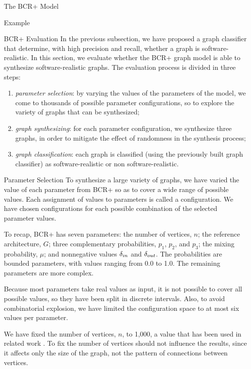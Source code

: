 \documentclass[11pt,twocolumn,a4paper,english]{article}
\begin{document}
\begin{section}{The BCR+ Model}
\begin{subsection}{Example}
\end{subsection}
	
\begin{subsection}{BCR+ Evaluation}
	In the previous subsection, we have proposed a graph classifier that determine, with high precision and recall, whether a graph is software-realistic. In this section, we evaluate whether the BCR+ graph model is able to synthesize software-realistic graphs. The evaluation process is divided in three steps:
	
	\begin{enumerate}
		\item \emph{parameter selection}: by varying the values of the parameters of the model, we come to thousands of possible parameter configurations, so to explore the variety of graphs that can be synthesized;
		
		\item \emph{graph synthesizing}: for each parameter configuration, we synthesize three graphs, in order to mitigate the effect of randomness in the synthesis process;
		
		\item \emph{graph classification}: each graph is classified (using the previously built graph classifier) as software-realistic or non software-realistic.
	\end{enumerate}
	
\begin{subsubsection}{Parameter Selection}
	To synthesize a large variety of graphs, we have varied the value of each parameter from BCR+ so as to cover a wide range of possible values. Each assignment of values to parameters is called a configuration. We have chosen configurations for each possible combination of the selected parameter values.
		
	To recap, BCR+ has seven parameters: the number of vertices, $n$; the reference architecture, $G$; three complementary probabilities, $p_1$, $p_2$, and $p_3$; the mixing probability, $\mu$; and nonnegative values $\delta_{in}$ and $\delta_{out}$. The probabilities are bounded parameters, with values ranging from 0.0 to 1.0. The remaining parameters are more complex.
	
	Because most parameters take real values as input, it is not possible to cover all possible values, so they have been split in discrete intervals. Also, to avoid combinatorial explosion, we have limited the configuration space to at most six values per parameter.
	
	We have fixed the number of vertices, $n$, to 1,000, a value that has been used in related work \cite{Lancichinetti2009b}. To fix the number of vertices should not influence the results, since it affects only the size of the graph, not the pattern of connections between vertices.
	

\end{subsubsection}
\end{subsection}
\end{section}
\end{document}
